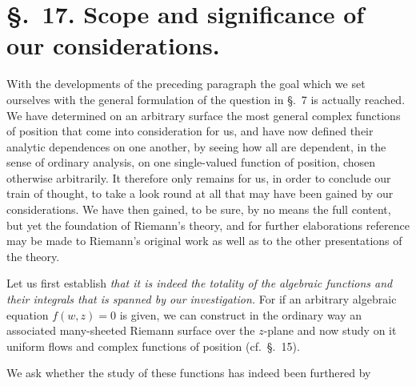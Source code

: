 \documentclass{article}
\begin{document}
\section*{§.~17. Scope and significance of our considerations.}

With the developments of the preceding paragraph the goal which we set ourselves with the general formulation of the question in §.~7 is actually reached. We have determined on an arbitrary surface the most general complex functions of position that come into consideration for us, and have now defined their analytic dependences on one another, by seeing how all are dependent, in the sense of ordinary analysis, on one single-valued function of position, chosen otherwise arbitrarily. It therefore only remains for us, in order to conclude our train of thought, to take a look round at all that may have been gained by our considerations. We have then gained, to be sure, by no means the full content, but yet the foundation of Riemann's theory, and for further elaborations reference may be made to Riemann's original work as well as to the other presentations of the theory.

Let us first establish \emph{that it is indeed the totality of the algebraic functions and their integrals that is spanned by our investigation.} For if an arbitrary algebraic equation $f(w, z) = 0$ is given, we can construct in the ordinary way an associated many-sheeted Riemann surface over the $z$-plane and now study on it uniform flows and complex functions of position (cf.\ §.~15).

We ask whether the study of these functions has indeed been furthered by
\end{document}

